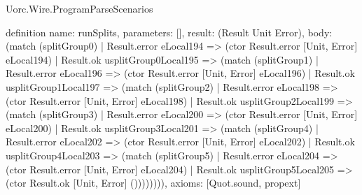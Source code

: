 \begin{lexlean}{Uorc.Wire.ProgramParseScenarios}
\begin{semanticmodule}
definition{
  name: runSplits,
  parameters: [],
  result: (Result Unit Error),
  body: (match (splitGroup0)
    | Result.error eLocal194 => (ctor Result.error [Unit, Error] eLocal194)
    | Result.ok usplitGroup0Local195 => (match (splitGroup1)
      | Result.error eLocal196 => (ctor Result.error [Unit, Error] eLocal196)
      | Result.ok usplitGroup1Local197 => (match (splitGroup2)
        | Result.error eLocal198 => (ctor Result.error [Unit, Error] eLocal198)
        | Result.ok usplitGroup2Local199 => (match (splitGroup3)
          | Result.error eLocal200 => (ctor Result.error [Unit, Error] eLocal200)
          | Result.ok usplitGroup3Local201 => (match (splitGroup4)
            | Result.error eLocal202 => (ctor Result.error [Unit, Error] eLocal202)
            | Result.ok usplitGroup4Local203 => (match (splitGroup5)
              | Result.error eLocal204 => (ctor Result.error [Unit, Error] eLocal204)
              | Result.ok usplitGroup5Local205 => (ctor Result.ok [Unit, Error] ()))))))),
  axioms: [Quot.sound, propext]
}


\end{semanticmodule}
\end{lexlean}

